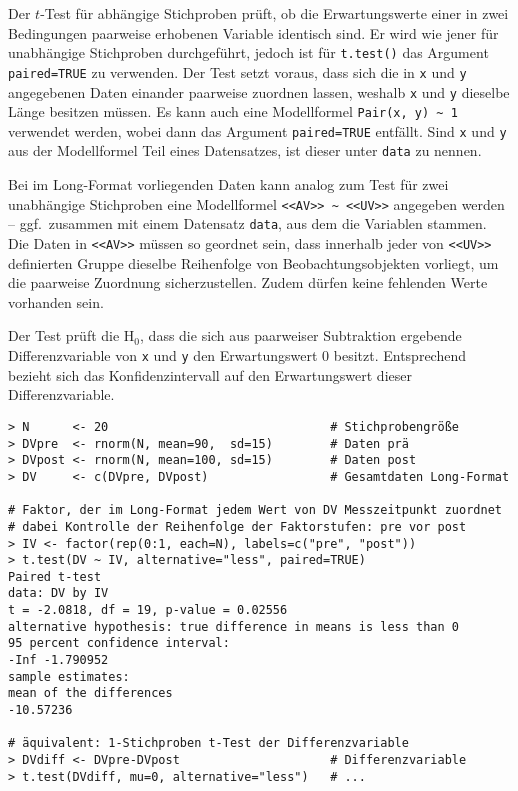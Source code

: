 Der $t$-Test für abhängige Stichproben prüft, ob die Erwartungswerte einer in zwei Bedingungen paarweise erhobenen Variable identisch sind. Er wird wie jener für unabhängige Stichproben durchgeführt, jedoch ist für \lstinline!t.test()! das Argument \lstinline!paired=TRUE! zu verwenden. Der Test setzt voraus, dass sich die in \lstinline!x! und \lstinline!y! angegebenen Daten einander paarweise zuordnen lassen, weshalb \lstinline!x! und \lstinline!y! dieselbe Länge besitzen müssen. Es kann auch eine Modellformel \lstinline!Pair(x, y) ~ 1! verwendet werden, wobei dann das Argument \lstinline!paired=TRUE! entfällt. Sind \lstinline!x! und \lstinline!y! aus der Modellformel Teil eines Datensatzes, ist dieser unter \lstinline!data! zu nennen.

Bei im Long-Format vorliegenden Daten kann analog zum Test für zwei unabhängige Stichproben eine Modellformel \lstinline!<<AV>> ~ <<UV>>! angegeben werden -- ggf.\ zusammen mit einem Datensatz \lstinline!data!, aus dem die Variablen stammen. Die Daten in \lstinline!<<AV>>! müssen so geordnet sein, dass innerhalb jeder von \lstinline!<<UV>>! definierten Gruppe dieselbe Reihenfolge von Beobachtungsobjekten vorliegt, um die paarweise Zuordnung sicherzustellen. Zudem dürfen keine fehlenden Werte vorhanden sein.

Der Test prüft die $\text{H}_{0}$, dass die sich aus paarweiser Subtraktion ergebende Differenzvariable von \lstinline!x! und \lstinline!y! den Erwartungswert $0$ besitzt. Entsprechend bezieht sich das Konfidenzintervall auf den Erwartungswert dieser Differenzvariable.
\begin{lstlisting}
> N      <- 20                               # Stichprobengröße
> DVpre  <- rnorm(N, mean=90,  sd=15)        # Daten prä
> DVpost <- rnorm(N, mean=100, sd=15)        # Daten post
> DV     <- c(DVpre, DVpost)                 # Gesamtdaten Long-Format

# Faktor, der im Long-Format jedem Wert von DV Messzeitpunkt zuordnet
# dabei Kontrolle der Reihenfolge der Faktorstufen: pre vor post
> IV <- factor(rep(0:1, each=N), labels=c("pre", "post"))
> t.test(DV ~ IV, alternative="less", paired=TRUE)
Paired t-test
data: DV by IV
t = -2.0818, df = 19, p-value = 0.02556
alternative hypothesis: true difference in means is less than 0
95 percent confidence interval:
-Inf -1.790952
sample estimates:
mean of the differences
-10.57236

# äquivalent: 1-Stichproben t-Test der Differenzvariable
> DVdiff <- DVpre-DVpost                     # Differenzvariable
> t.test(DVdiff, mu=0, alternative="less")   # ...
\end{lstlisting}

